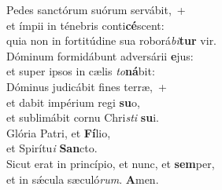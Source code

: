 \evenverse Pedes sanctórum suórum servábit,~+\\
\evenverse  et ímpii in ténebris conti\textbf{cé}scent:~\*\\
\evenverse quia non in fortitúdine sua roborá\textit{bi}\textbf{tur} vir.\\
\oddverse Dóminum formidábunt adversárii \textbf{e}jus:~\*\\
\oddverse et super ipsos in cælis \textit{to}\textbf{ná}bit:\\
\evenverse Dóminus judicábit fines terræ,~+\\
\evenverse  et dabit impérium regi \textbf{su}o,~\*\\
\evenverse et sublimábit cornu Chri\textit{sti} \textbf{su}i.\\
\oddverse Glória Patri, et \textbf{Fí}lio,~\*\\
\oddverse et Spirítu\textit{i} \textbf{San}cto.\\
\evenverse Sicut erat in princípio, et nunc, et \textbf{sem}per,~\*\\
\evenverse et in sǽcula sæculó\textit{rum}. \textbf{A}men.\\
